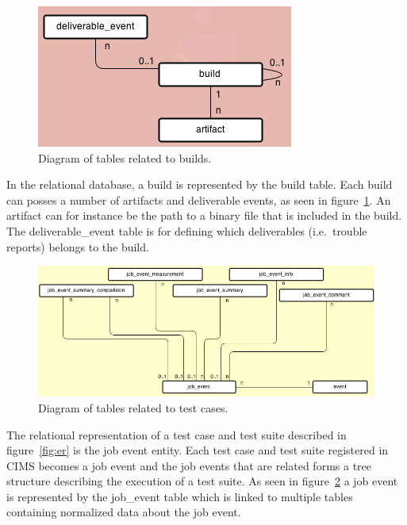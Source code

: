 \begin{figure}[h!]
\centering
\includegraphics[scale=0.5]{figure/build.jpg}
\caption{Diagram of tables related to builds.}
\label{fig:build}
\end{figure}
In the relational database, a build is represented by the build table. Each build can posses a number of artifacts and deliverable events, as seen in figure~\ref{fig:build}. An artifact can for instance be the path to a binary file that is included in the build. The deliverable\_event table is for defining which deliverables (i.e.\ trouble reports) belongs to the build.
\label{sec:jobEvent}
\begin{figure}[h!]
\centering
\includegraphics[scale=0.5]{figure/job_event.jpg}
\caption{Diagram of tables related to test cases.}
\label{fig:job_event}
\end{figure}
The relational representation of a test case and test suite described in figure~\ref{fig:er} is the job event entity. Each test case and test suite registered in CIMS becomes a job event and the job events that are related forms a tree structure describing the execution of a test suite. As seen in figure~\ref{fig:job_event} a job event is represented by the job\_event table which is linked to multiple tables containing normalized data about the job event.


